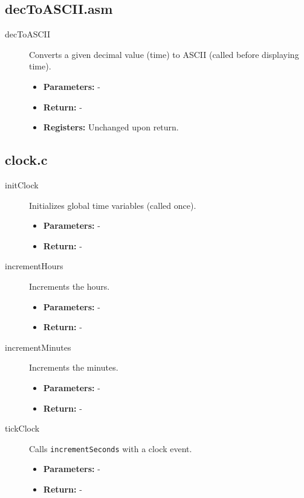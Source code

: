 \documentclass[a4paper,12pt]{article}
\begin{document}
\subsection{decToASCII.asm}

\begin{description}
    \item[decToASCII] Converts a given decimal value (time) to ASCII (called before displaying time).
    \begin{itemize}
        \item \textbf{Parameters:} -
        \item \textbf{Return:} -
        \item \textbf{Registers:} Unchanged upon return.
    \end{itemize}
\end{description}

\subsection{clock.c}

\begin{description}
    \item[initClock] Initializes global time variables (called once).
    \begin{itemize}
        \item \textbf{Parameters:} -
        \item \textbf{Return:} -
    \end{itemize}
    
    \item[incrementHours] Increments the hours.
    \begin{itemize}
        \item \textbf{Parameters:} -
        \item \textbf{Return:} -
    \end{itemize}
    
    \item[incrementMinutes] Increments the minutes.
    \begin{itemize}
        \item \textbf{Parameters:} -
        \item \textbf{Return:} -
    \end{itemize}
    
    \item[tickClock] Calls \texttt{incrementSeconds} with a clock event.
    \begin{itemize}
        \item \textbf{Parameters:} -
        \item \textbf{Return:} -
    \end{itemize}
\end{description}
\end{document}
